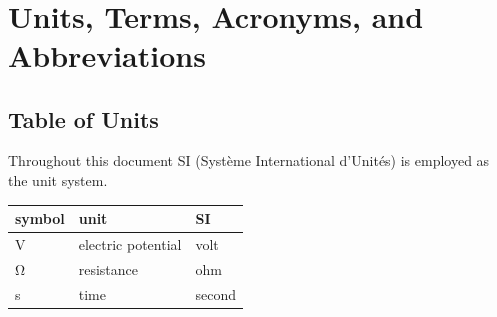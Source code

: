 \documentclass[12pt]{article}
\begin{document}
~\newpage

\section{Units, Terms, Acronyms, and Abbreviations}

\subsection{Table of Units}
Throughout this document SI (Syst\`{e}me International d'Unit\'{e}s) is employed
as the unit system.

\begin{table}[ht]
  \noindent \begin{tabular}{l l l} 
    \toprule		
    \textbf{symbol} & \textbf{unit} & \textbf{SI}\\
    \midrule 
    \si{\volt} & electric potential & volt\\
    \si{\ohm} & resistance	& ohm\\
    \si{\second} & time & second\\
    \bottomrule
  \end{tabular}
\end{table}
\end{document}
